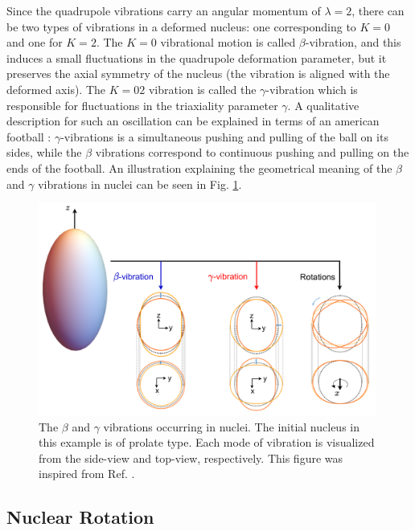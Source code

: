 Since the quadrupole vibrations carry an angular momentum of $\lambda=2$, there can be two types of vibrations in a deformed nucleus: one corresponding to $K=0$ and one for $K=2$. The $K=0$ vibrational motion is called $\beta$-vibration, and this induces a small fluctuations in the quadrupole deformation parameter, but it preserves the axial symmetry of the nucleus (the vibration is aligned with the deformed axis). The $K=02$ vibration is called the $\gamma$-vibration which is responsible for fluctuations in the triaxiality parameter $\gamma$. A qualitative description for such an oscillation can be explained in terms of an american football \cite{krane1991introductory}: $\gamma$-vibrations is a simultaneous pushing and pulling of the ball on its sides, while the $\beta$ vibrations correspond to continuous pushing and pulling on the ends of the football. An illustration explaining the geometrical meaning of the $\beta$ and $\gamma$ vibrations in nuclei can be seen in Fig. \ref{rotation-vibration-geometrics}.
\begin{figure}
    \centering
    \includegraphics[width=0.99\textwidth]{Chapters/Figures/rotationsVibrations_Rotations.pdf}
    \caption{The $\beta$ and $\gamma$ vibrations occurring in nuclei. The initial nucleus in this example is of prolate type. Each mode of vibration is visualized from the side-view and top-view, respectively. This figure was inspired from Ref. \cite{li2022model}.}
    \label{rotation-vibration-geometrics}
\end{figure}

\subsection{Nuclear Rotation}

